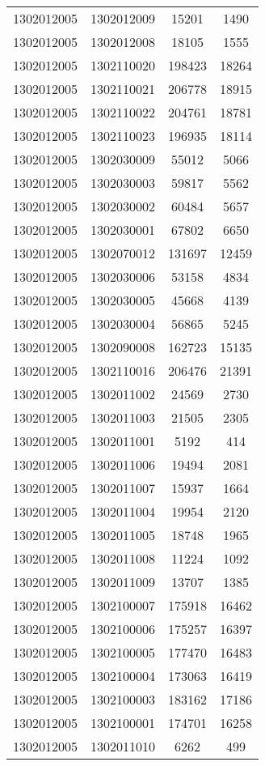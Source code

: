 \begin{longtable}{llcc}
1302012005 & 1302012009 & 15201 & 1490\\
1302012005 & 1302012008 & 18105 & 1555\\
1302012005 & 1302110020 & 198423 & 18264\\
1302012005 & 1302110021 & 206778 & 18915\\
1302012005 & 1302110022 & 204761 & 18781\\
1302012005 & 1302110023 & 196935 & 18114\\
1302012005 & 1302030009 & 55012 & 5066\\
1302012005 & 1302030003 & 59817 & 5562\\
1302012005 & 1302030002 & 60484 & 5657\\
1302012005 & 1302030001 & 67802 & 6650\\
1302012005 & 1302070012 & 131697 & 12459\\
1302012005 & 1302030006 & 53158 & 4834\\
1302012005 & 1302030005 & 45668 & 4139\\
1302012005 & 1302030004 & 56865 & 5245\\
1302012005 & 1302090008 & 162723 & 15135\\
1302012005 & 1302110016 & 206476 & 21391\\
1302012005 & 1302011002 & 24569 & 2730\\
1302012005 & 1302011003 & 21505 & 2305\\
1302012005 & 1302011001 & 5192 & 414\\
1302012005 & 1302011006 & 19494 & 2081\\
1302012005 & 1302011007 & 15937 & 1664\\
1302012005 & 1302011004 & 19954 & 2120\\
1302012005 & 1302011005 & 18748 & 1965\\
1302012005 & 1302011008 & 11224 & 1092\\
1302012005 & 1302011009 & 13707 & 1385\\
1302012005 & 1302100007 & 175918 & 16462\\
1302012005 & 1302100006 & 175257 & 16397\\
1302012005 & 1302100005 & 177470 & 16483\\
1302012005 & 1302100004 & 173063 & 16419\\
1302012005 & 1302100003 & 183162 & 17186\\
1302012005 & 1302100001 & 174701 & 16258\\
1302012005 & 1302011010 & 6262 & 499\\

\end{longtable}
